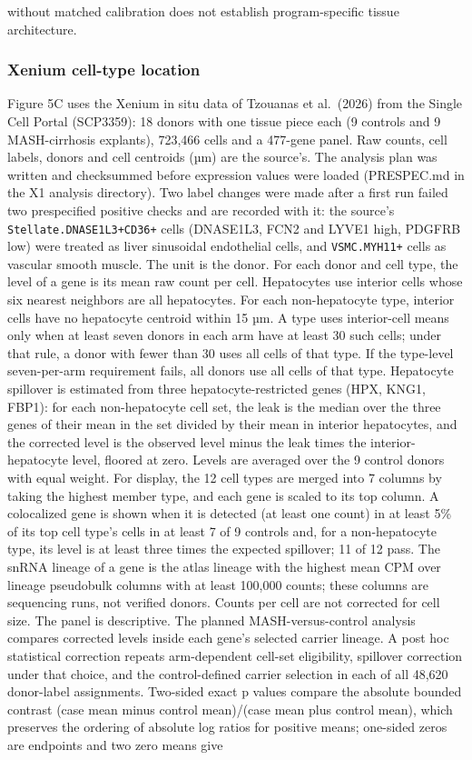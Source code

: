 without matched calibration does not establish program-specific tissue architecture.

\subsubsection{Xenium cell-type location}\label{xenium-cell-type-location}

Figure 5C uses the Xenium in situ data of Tzouanas et al.~(2026) from the Single Cell Portal (SCP3359): 18 donors with one tissue piece each (9 controls and 9 MASH-cirrhosis explants), 723,466 cells and a 477-gene panel. Raw counts, cell labels, donors and cell centroids (µm) are the source's. The analysis plan was written and checksummed before expression values were loaded (PRESPEC.md in the X1 analysis directory). Two label changes were made after a first run failed two prespecified positive checks and are recorded with it: the source's \texttt{Stellate.DNASE1L3+CD36+} cells (DNASE1L3, FCN2 and LYVE1 high, PDGFRB low) were treated as liver sinusoidal endothelial cells, and \texttt{VSMC.MYH11+} cells as vascular smooth muscle. The unit is the donor. For each donor and cell type, the level of a gene is its mean raw count per cell. Hepatocytes use interior cells whose six nearest neighbors are all hepatocytes. For each non-hepatocyte type, interior cells have no hepatocyte centroid within 15 µm. A type uses interior-cell means only when at least seven donors in each arm have at least 30 such cells; under that rule, a donor with fewer than 30 uses all cells of that type. If the type-level seven-per-arm requirement fails, all donors use all cells of that type. Hepatocyte spillover is estimated from three hepatocyte-restricted genes (HPX, KNG1, FBP1): for each non-hepatocyte cell set, the leak is the median over the three genes of their mean in the set divided by their mean in interior hepatocytes, and the corrected level is the observed level minus the leak times the interior-hepatocyte level, floored at zero. Levels are averaged over the 9 control donors with equal weight. For display, the 12 cell types are merged into 7 columns by taking the highest member type, and each gene is scaled to its top column. A colocalized gene is shown when it is detected (at least one count) in at least 5\% of its top cell type's cells in at least 7 of 9 controls and, for a non-hepatocyte type, its level is at least three times the expected spillover; 11 of 12 pass. The snRNA lineage of a gene is the atlas lineage with the highest mean CPM over lineage pseudobulk columns with at least 100,000 counts; these columns are sequencing runs, not verified donors. Counts per cell are not corrected for cell size. The panel is descriptive. The planned MASH-versus-control analysis compares corrected levels inside each gene's selected carrier lineage. A post hoc statistical correction repeats arm-dependent cell-set eligibility, spillover correction under that choice, and the control-defined carrier selection in each of all 48,620 donor-label assignments. Two-sided exact p values compare the absolute bounded contrast (case mean minus control mean)/(case mean plus control mean), which preserves the ordering of absolute log ratios for positive means; one-sided zeros are endpoints and two zero means give 